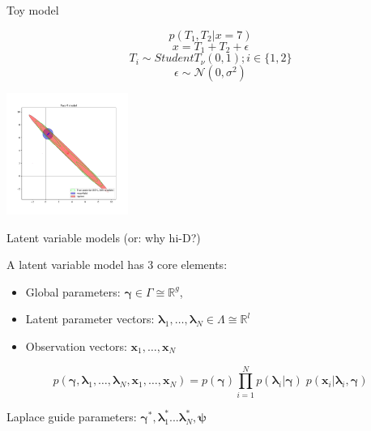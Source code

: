 \documentclass[
  ignorenonframetext,
]{beamer}
\providecommand{\tightlist}{%
  \setlength{\itemsep}{0pt}\setlength{\parskip}{0pt}}
\begin{document}
\begin{frame}{Toy model}
\protect\hypertarget{toy-model-2}{}

\[p(T_1,T_2|x=7)\] \[x= T_1+T_2+\epsilon\]
\[T_i\sim StudentT_{\nu}(0,1); i\in\{1,2\}\]
\[\epsilon\sim \mathcal{N}(0,\sigma^2)\]

\begin{center}\includegraphics[width=150px]{full} \end{center}

\end{frame}

\begin{frame}{Latent variable models (or: why hi-D?)}
\protect\hypertarget{latent-variable-models-or-why-hi-d}{}

A latent variable model has 3 core elements:

\begin{itemize}
\tightlist
\item
  Global parameters: \(\bm{\gamma}\in\Gamma \cong \mathbb{R}^g\),
\item
  Latent parameter vectors:
  \(\bm{\lambda}_1,\dots,\bm{\lambda}_N\in\Lambda \cong \mathbb{R}^l\)
\item
  Observation vectors: \(\bm{x}_1,\dots,\bm{x}_N\)
\end{itemize}

\[p\left(\bm{\gamma}, \bm{\lambda}_1,\dots,\bm{\lambda}_N,\bm{x}_1,\dots,\bm{x}_N\right) = p(\bm{\gamma})\prod_{i=1}^N p(\bm{\lambda}_i|\bm{\gamma})\; p(\bm{x}_i|\bm{\lambda}_i,\bm{\gamma})\]

Laplace guide parameters:
\(\bm{\gamma}^*,\bm{\lambda}^*_1...\bm{\lambda}^*_N,\bm{\psi}\)

\end{frame}
\end{document}
